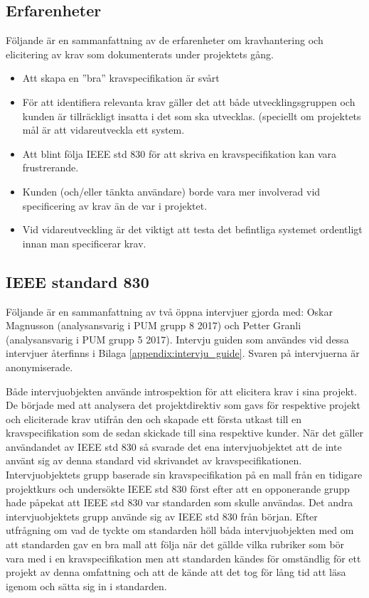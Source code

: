 \subsection{Erfarenheter}
Följande är en sammanfattning av de erfarenheter om kravhantering och elicitering av krav som dokumenterats under projektets gång.
\begin{itemize}
	\item Att skapa en ”bra” kravspecifikation är svårt
	\item För att identifiera relevanta krav gäller det att både utvecklingsgruppen och kunden är tillräckligt insatta i det som ska utvecklas. (speciellt om projektets mål är att vidareutveckla ett system.
	\item Att blint följa IEEE std 830 för att skriva en kravspecifikation kan vara frustrerande.
	\item Kunden (och/eller tänkta användare) borde vara mer involverad vid specificering av krav än de var i projektet.
	\item Vid vidareutveckling är det viktigt att testa det befintliga systemet ordentligt innan man specificerar krav.
\end{itemize}

\subsection{IEEE standard 830}
Följande är en sammanfattning av två öppna intervjuer gjorda med: Oskar Magnusson (analysansvarig i PUM grupp 8 2017) och Petter Granli (analysansvarig i PUM grupp 5 2017). Intervju guiden som användes vid dessa intervjuer återfinns i Bilaga \ref{appendix:intervju_guide}. Svaren på intervjuerna är anonymiserade.  

Både intervjuobjekten använde introspektion för att elicitera krav i sina projekt. De började med att analysera det projektdirektiv som gavs för respektive projekt och eliciterade krav utifrån den och skapade ett första utkast till en kravspecifikation som de sedan skickade till sina respektive kunder. När det gäller användandet av IEEE std 830 så svarade det ena intervjuobjektet att de inte använt sig av denna standard vid skrivandet av kravspecifikationen. Intervjuobjektets grupp baserade sin kravspecifikation på en mall från en tidigare projektkurs och undersökte IEEE std 830 först efter att en opponerande grupp hade påpekat att IEEE std 830 var standarden som skulle användas. Det andra intervjuobjektets grupp använde sig av IEEE std 830 från början. Efter utfrågning om vad de tyckte om standarden höll båda intervjuobjekten med om att standarden gav en bra mall att följa när det gällde vilka rubriker som bör vara med i en kravspecifikation men att standarden kändes för omständlig för ett projekt av denna omfattning och att de kände att det tog för lång tid att läsa igenom och sätta sig in i standarden.          

